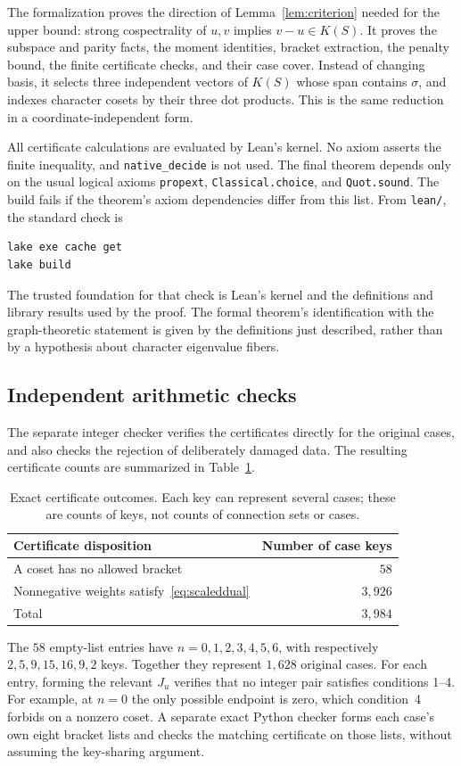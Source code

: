 The formalization proves the direction of
Lemma~\ref{lem:criterion} needed for the upper bound:
strong cospectrality of $u,v$ implies $v-u\in K(S)$.
It proves the subspace and parity facts, the moment identities, bracket
extraction, the penalty bound, the finite certificate checks, and their
case cover. Instead of changing basis, it selects three independent
vectors of $K(S)$ whose span contains $\sigma$, and indexes character
cosets by their three dot products. This is the same reduction in a
coordinate-independent form.

All certificate calculations are evaluated by Lean's kernel. No axiom asserts the finite inequality, and
\texttt{native\_decide} is not used. The final theorem depends only on the usual
logical axioms \texttt{propext}, \texttt{Classical.choice}, and
\texttt{Quot.sound}. The build fails if the theorem's axiom dependencies
differ from this list.
From \texttt{lean/}, the standard check is
\begin{verbatim}
lake exe cache get
lake build
\end{verbatim}
The trusted foundation for that check is Lean's kernel and the
definitions and library results used by the proof. The formal theorem's
identification with the graph-theoretic statement is given by the
definitions just described, rather than by a hypothesis about character
eigenvalue fibers.

\subsection{Independent arithmetic checks}
The separate integer checker verifies the certificates directly for the
original cases, and also checks the rejection of deliberately damaged data.
The resulting certificate counts are summarized in Table~\ref{tab:certificates}.
\begin{table}[htbp]
\centering
\begin{tabular}{lr}
\hline
Certificate disposition & Number of case keys\\
\hline
A coset has no allowed bracket & $58$\\
Nonnegative weights satisfy~\eqref{eq:scaleddual} & $3{,}926$\\
\hline
Total & $3{,}984$\\
\hline
\end{tabular}
\caption{Exact certificate outcomes. Each key can represent several
cases; these are counts of keys, not counts of connection sets or cases.}
\label{tab:certificates}
\end{table}
The $58$ empty-list entries have $n=0,1,2,3,4,5,6$, with respectively
$2,5,9,15,16,9,2$ keys. Together they represent $1{,}628$ original cases.
For each entry, forming the relevant $J_u$ verifies that no integer pair
satisfies conditions 1--4. For example, at $n=0$ the only possible endpoint
is zero, which condition~4 forbids on a nonzero coset.
A separate exact Python checker forms each case's own eight bracket
lists and checks the matching certificate on those lists, without
assuming the key-sharing argument.

